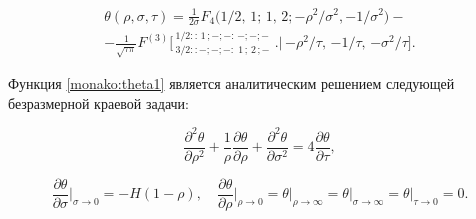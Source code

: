 %


\begin{multline}

\theta(\rho,\sigma,\tau)=\frac{1}{2\sigma}F_4\big(1 / 2,\,1;\,1,\,2;{-\rho^2}/{\sigma^2}, {-1}/{\sigma^2}\big)-\\

\label{monako:theta1}

- \frac{1}{\sqrt{\tau \pi}} F^{(3)}\bigg[\,^{\displaystyle 1 / 2::\,1\,;-;-:\,-;-;-}_{\displaystyle 3 / 2::-;-;-:\,\,1\,;\,2\,;-}\,\,\bigg.\bigg|\,{-\rho^2}/{\tau},\,{-1}/{\tau},\,{-\sigma^2}/{\tau}\bigg].

\end{multline}





Функция \eqref{monako:theta1} является аналитическим решением следующей безразмерной краевой задачи:

$$

\frac{\partial^2\theta}{\partial \rho^2}+\frac{1}{\rho}\frac{\partial \theta}{\partial \rho}+\frac{\partial^2\theta}{\partial \sigma^2}=4\frac{\partial \theta}{\partial \tau},

$$

$$

\frac{\partial \theta}{\partial \sigma}\Big|_{\sigma\to  0}=-H(1-\rho), \quad 

\frac{\partial \theta}{\partial \rho}\Big|_{\rho \to  0}= \theta\big|_{\rho\to \infty}=\theta\big|_{\sigma\to \infty}= \theta\big|_{\tau\to 0}=0.

$$

%

%

%



